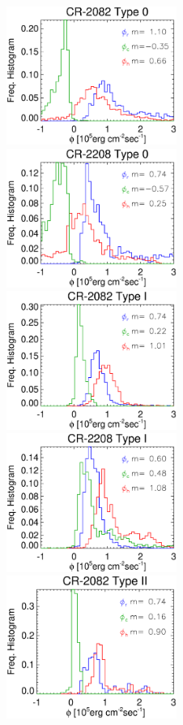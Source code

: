 \documentclass[namedreferences]{solarphysics}
\begin{document}
\begin{article}
\begin{figure}[ht]
\begin{center}
\includegraphics[width=0.495\textwidth]{figs/histocr2082_ccdownenergia.eps}
\includegraphics[width=0.495\textwidth]{figs/histocr2208_ccdownenergia.eps}
\includegraphics[width=0.495\textwidth]{figs/histocr2082_ccenergia.eps}
\includegraphics[width=0.495\textwidth]{figs/histocr2208_ccenergia.eps}
\includegraphics[width=0.495\textwidth]{figs/histocr2082_cgenergia.eps}

\end{center}
\end{figure}
\end{article}
\end{document}
